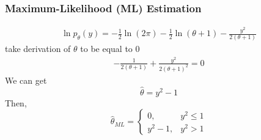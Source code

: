 \documentclass[11pt,a4paper]{article}
\begin{document}
\subsubsection{Maximum-Likelihood (ML) Estimation}
\begin{equation}
    \begin{aligned}
        \ln p_\theta(y)=-\frac{1}{2}\ln (2\pi)-\frac{1}{2}\ln(\theta+1)-\frac{y^2}{2(\theta+1)}
    \end{aligned}
    \nonumber
\end{equation}
take derivation of $\theta$ to be equal to $0$
\begin{equation}
    \begin{aligned}
        -\frac{1}{2(\theta+1)}+\frac{y^2}{2(\theta+1)^2}=0
    \end{aligned}
    \nonumber
\end{equation}
We can get $$\hat{\theta}=y^2-1$$
Then, $$\hat{\theta}_{ML}=\left\{\begin{matrix}
    0,&y^2\leq 1\\
    y^2-1,&y^2>1
\end{matrix}\right.$$
\end{document}
